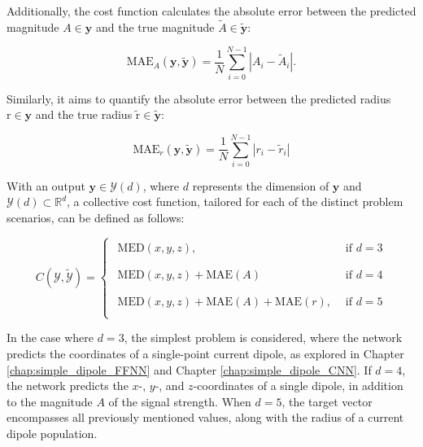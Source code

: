 \documentclass[a4paper, UKenglish, 11pt]{uiomaster}
\begin{document}
Additionally, the cost function calculates the absolute error between the predicted magnitude ${A} \in \mathbf{y}$ and the true magnitude $\tilde{A} \in \mathbf{\tilde{y}}$:

\begin{equation}
    \text{MAE$_A$}(\mathbf{y}, \mathbf{\tilde{y}}) = \frac{1}{N} \sum_{i=0}^{N-1} | A_{i} - \tilde{A}_{i} |.
\label{eq:MAE_A}
\end{equation}

Similarly, it aims to quantify the absolute error between the predicted radius ${\text{r}} \in \mathbf{y}$ and the true radius $\tilde{\text{r}} \in \mathbf{\tilde{y}}$:

\begin{equation}
    \text{MAE$_r$}(\mathbf{y}, \mathbf{\tilde{y}}) = \frac{1}{N} \sum_{i=0}^{N-1} | r_{i} - \tilde{r}_{i} |
\label{eq:MAE_r}
\end{equation}

With an output $\textbf{y} \in \mathcal{Y}(d)$, where $d$ represents the dimension of $\textbf{y}$ and $\mathcal{Y}(d) \subset \mathbb{R}^d$, a collective cost function, tailored for each of the distinct problem scenarios, can be defined as follows:

\begin{equation}
    C(\mathcal{Y}, \mathcal{\tilde{Y}}) =
    \begin{cases}
      \begin{array}{l}
      \text{MED}(x,y,z),
      \end{array} & \text{if } d = 3\\
      \\
      \begin{array}{l}
      \text{MED}(x,y,z) + \text{MAE}(A)
      \end{array} & \text{if } d = 4\\
      \\
      \begin{array}{l}
      \text{MED}(x,y,z) + \text{MAE}(A) + \text{MAE}(r),
      \end{array} & \text{if } d = 5\\
    \end{cases}
    \label{eq:cost_function}
\end{equation}

In the case where $d = 3$, the simplest problem is considered, where the network predicts the coordinates of a single-point current dipole, as explored in Chapter \ref{chap:simple_dipole_FFNN} and Chapter \ref{chap:simple_dipole_CNN}. If $d = 4$, the network predicts the $x$-, $y$-, and $z$-coordinates of a single dipole, in addition to the magnitude $A$ of the signal strength. When $d = 5$, the target vector encompasses all previously mentioned values, along with the radius of a current dipole population.
\end{document}
